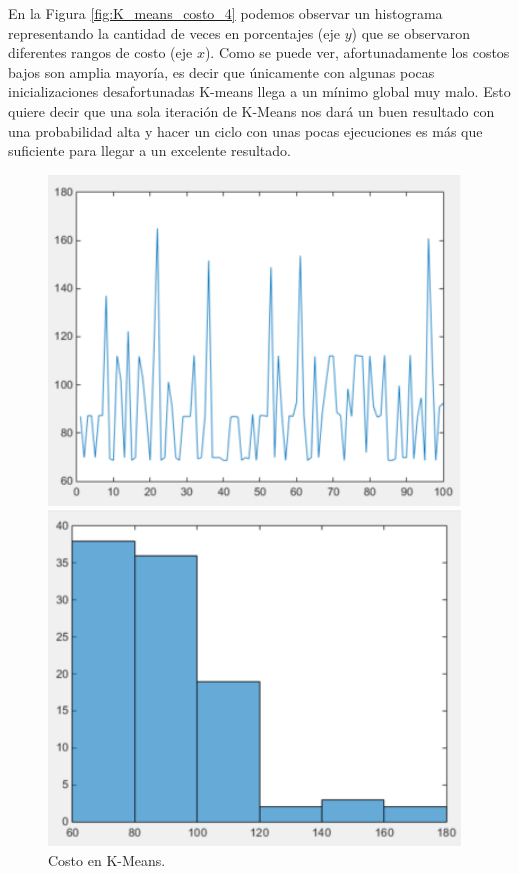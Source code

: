 \documentclass[12pt,a4paper]{article}
\begin{document}
\begin{sloppypar}
En la Figura \ref{fig:K_means_costo_4} podemos observar un histograma representando la cantidad de veces en porcentajes (eje $y$) que se observaron diferentes rangos de costo (eje $x$). Como se puede ver, afortunadamente los costos bajos son amplia mayoría, es decir que únicamente con algunas pocas inicializaciones desafortunadas K-means llega a un mínimo global muy malo. Esto quiere decir que una sola iteración de K-Means nos dará un buen resultado con una probabilidad alta y hacer un ciclo con unas pocas ejecuciones es más que suficiente para llegar a un excelente resultado.

\begin{figure}[H] %
\begin{minipage}[b]{0.5\linewidth}
\centering
\includegraphics[width=\linewidth]{images/K_means_costo_3.png}
\caption{Costo en K-Means. \cite{apunte_uba}}
\label{fig:K_means_costo_3}
\end{minipage}
\hspace{0.5cm}
\begin{minipage}[b]{0.5\linewidth}
\centering
\includegraphics[width=\linewidth]{images/K_means_costo_4.png}

\end{minipage}
\end{figure}
\end{sloppypar}
\end{document}

